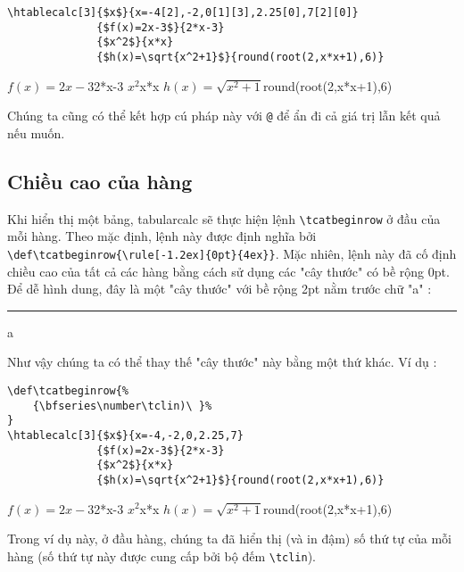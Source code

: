 \documentclass[a4paper,10pt]{article}
\newcommand\tbcalc{\textsf{tabularcalc}\xspace}
\newcommand\verbinline{\lstinline[breaklines=false,basicstyle=\normalsize\ttfamily]}
\newcommand\mywidth{0.85\linewidth}
\begin{document}
\begin{center}
\begin{minipage}{\mywidth}
\begin{lstlisting}
\htablecalc[3]{$x$}{x=-4[2],-2,0[1][3],2.25[0],7[2][0]}
              {$f(x)=2x-3$}{2*x-3}
              {$x^2$}{x*x}
              {$h(x)=\sqrt{x^2+1}$}{round(root(2,x*x+1),6)}
\end{lstlisting}
\end{minipage}

              {$f(x)=2x-3$}{2*x-3}
              {$x^2$}{x*x}
              {$h(x)=\sqrt{x^2+1}$}{round(root(2,x*x+1),6)}
\end{center}
Chúng ta cũng có thể kết hợp cú pháp này với \verb|@| để ẩn đi cả giá trị lẫn kết quả nếu muốn.

\subsection{Chiều cao của hàng}
Khi hiển thị một bảng, \tbcalc sẽ thực hiện lệnh \verbinline|\tcatbeginrow| ở đầu của mỗi hàng. Theo mặc định, lệnh này được định nghĩa bởi \verbinline|\def\tcatbeginrow{\rule[-1.2ex]{0pt}{4ex}}|. Mặc nhiên, lệnh này đã cố định chiều cao của tất cả các hàng bằng cách sử dụng các "cây thước" có bề rộng 0pt. Để dễ hình dung, đây là một "cây thước" với bề rộng 2pt nằm trước chữ "a" : \rule[-1.2ex]{2pt}{4ex}a\medskip 

Như vậy chúng ta có thể thay thế "cây thước" này bằng một thứ khác. Ví dụ :

\begin{center}
\begin{minipage}{\mywidth}
\begin{lstlisting}
\def\tcatbeginrow{%
	{\bfseries\number\tclin)\ }%
}
\htablecalc[3]{$x$}{x=-4,-2,0,2.25,7}
              {$f(x)=2x-3$}{2*x-3}
              {$x^2$}{x*x}
              {$h(x)=\sqrt{x^2+1}$}{round(root(2,x*x+1),6)}
\end{lstlisting}
\end{minipage}

\def\tcatbeginrow{%
	{\bfseries\number\tclin)\ }%
}
              {$f(x)=2x-3$}{2*x-3}
              {$x^2$}{x*x}
              {$h(x)=\sqrt{x^2+1}$}{round(root(2,x*x+1),6)}
\end{center}
Trong ví dụ này, ở đầu hàng, chúng ta đã hiển thị (và in đậm) số thứ tự của mỗi hàng (số thứ tự này được cung cấp bởi bộ đếm \verbinline|\tclin|).
\end{document}
